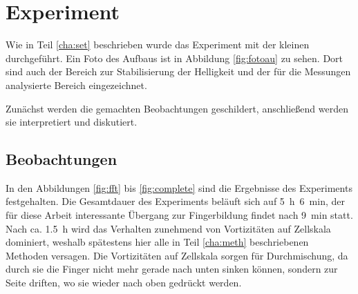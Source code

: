 % 



\section{\COTm Experiment}
\label{res:cot}


Wie in Teil \ref{cha:set} beschrieben wurde das \COTm Experiment mit der kleinen \HSC durchgeführt. Ein Foto des Aufbaus ist in Abbildung \ref{fig:fotoau} zu sehen. Dort sind auch der Bereich zur Stabilisierung der Helligkeit und der für die Messungen analysierte Bereich eingezeichnet.

Zunächst werden die gemachten Beobachtungen geschildert, anschließend werden sie interpretiert und diskutiert.


\subsection{Beobachtungen}
\label{res:cot:beob}



In den Abbildungen \ref{fig:fft} bis \ref{fig:complete} sind die Ergebnisse des \COTm Experiments festgehalten. Die Gesamtdauer des Experiments beläuft sich auf \mbox{\SI{5}{\hour} \SI{6}{\minute}}, der für diese Arbeit interessante Übergang zur Fingerbildung findet nach \SI{9}{\minute} statt. Nach ca. \SI{1,5}{\hour} wird das Verhalten zunehmend von Vortizitäten auf Zellskala dominiert, weshalb spätestens hier alle in Teil \ref{cha:meth} beschriebenen Methoden versagen. 
Die Vortizitäten auf Zellskala sorgen für Durchmischung, da durch sie die Finger nicht mehr gerade nach unten sinken können, sondern zur Seite driften, wo sie wieder nach oben gedrückt werden.

